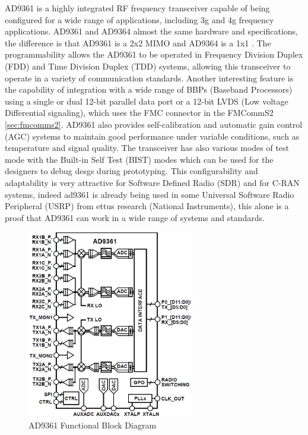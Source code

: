 AD9361 is a highly integrated RF frequency transceiver capable of being configured for a wide range of applications, including 3g and 4g frequency applications. AD9361 and AD9364 almost the same hardware and specifications, the difference is that AD9361 is a 2x2 MIMO and AD9364 is a 1x1 \cite{ad9361_wiki}.
The programmability allows the AD9361 to be operated in Frequency Division Duplex (FDD) and Time Division Duplex (TDD) systems, allowing this transceiver to operate in a variety of communication standards. Another interesting feature is the capability of integration with a wide range of BBPs (Baseband Processors) using a single or dual 12-bit parallel data port or a 12-bit LVDS (Low voltage Differential signaling), which uses the FMC connector in the FMCommS2 \ref{sec:fmcomms2}.
AD9361 also provides self-calibration and automatic gain control (AGC) systems to maintain good performance under variable conditions, such as temperature and signal quality. The transceiver has also various modes of test mode with the Built-in Self Test (BIST) modes which can be used for the designers to debug desgs during prototyping.
This configurability and adaptability is very attractive for Software Defined Radio (SDR) and for C-RAN systems, indeed ad9361 is already being used in some Universal Software Radio Peripheral (USRP) from ettus research (National Instruments), this alone is a proof that AD9361 can work in a wide range of systems and standards.

\begin{figure}[htbp]
    \centering
    \includegraphics[width=0.65\textwidth]{./figures/ad9361_functional_diagram}
    \caption{ AD9361 Functional Block Diagram
    \label{fig:ad9361func}}
\end{figure}

